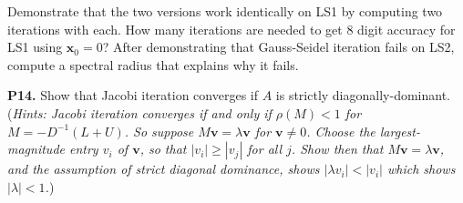 \documentclass[12pt]{amsart}
\newcommand{\bv}{\mathbf{v}}
\newcommand{\bx}{\mathbf{x}}
\newcommand{\prob}[1]{\bigskip\noindent\textbf{#1.}\quad }
\begin{document}
Demonstrate that the two versions work identically on LS1 by computing two iterations with each.  How many iterations are needed to get 8 digit accuracy for LS1 using $\bx_0=0$?
After demonstrating that Gauss-Seidel iteration fails on LS2, compute a spectral radius that explains why it fails.

\prob{P14}  Show that Jacobi iteration converges if $A$ is strictly diagonally-dominant.  (\emph{Hints:  Jacobi iteration converges if and only if $\rho(M) < 1$ for $M = - D^{-1}(L+U)$.  So suppose $M\bv = \lambda \bv$ for $\bv\ne 0$.  Choose the largest-magnitude entry $v_i$ of $\bv$, so that $|v_i| \ge |v_j|$ for all $j$.  Show then that $M\bv=\lambda\bv$, and the assumption of strict diagonal dominance, shows $|\lambda v_i| < |v_i|$ which shows $|\lambda|<1$.})
\end{document}
